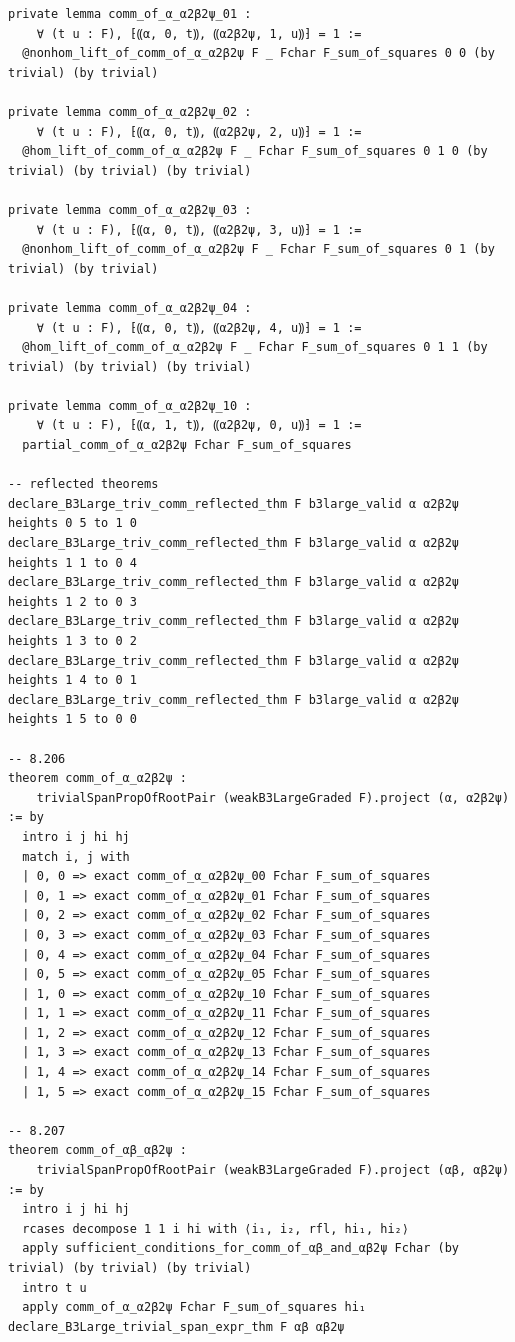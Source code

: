 \documentclass[10pt,a4paper]{article}
\begin{document}
\begin{Verbatim}
private lemma comm_of_α_α2β2ψ_01 :
    ∀ (t u : F), ⁅⸨α, 0, t⸩, ⸨α2β2ψ, 1, u⸩⁆ = 1 :=
  @nonhom_lift_of_comm_of_α_α2β2ψ F _ Fchar F_sum_of_squares 0 0 (by trivial) (by trivial)

private lemma comm_of_α_α2β2ψ_02 :
    ∀ (t u : F), ⁅⸨α, 0, t⸩, ⸨α2β2ψ, 2, u⸩⁆ = 1 :=
  @hom_lift_of_comm_of_α_α2β2ψ F _ Fchar F_sum_of_squares 0 1 0 (by trivial) (by trivial) (by trivial)

private lemma comm_of_α_α2β2ψ_03 :
    ∀ (t u : F), ⁅⸨α, 0, t⸩, ⸨α2β2ψ, 3, u⸩⁆ = 1 :=
  @nonhom_lift_of_comm_of_α_α2β2ψ F _ Fchar F_sum_of_squares 0 1 (by trivial) (by trivial)

private lemma comm_of_α_α2β2ψ_04 :
    ∀ (t u : F), ⁅⸨α, 0, t⸩, ⸨α2β2ψ, 4, u⸩⁆ = 1 :=
  @hom_lift_of_comm_of_α_α2β2ψ F _ Fchar F_sum_of_squares 0 1 1 (by trivial) (by trivial) (by trivial)

private lemma comm_of_α_α2β2ψ_10 :
    ∀ (t u : F), ⁅⸨α, 1, t⸩, ⸨α2β2ψ, 0, u⸩⁆ = 1 :=
  partial_comm_of_α_α2β2ψ Fchar F_sum_of_squares

-- reflected theorems
declare_B3Large_triv_comm_reflected_thm F b3large_valid α α2β2ψ heights 0 5 to 1 0
declare_B3Large_triv_comm_reflected_thm F b3large_valid α α2β2ψ heights 1 1 to 0 4
declare_B3Large_triv_comm_reflected_thm F b3large_valid α α2β2ψ heights 1 2 to 0 3
declare_B3Large_triv_comm_reflected_thm F b3large_valid α α2β2ψ heights 1 3 to 0 2
declare_B3Large_triv_comm_reflected_thm F b3large_valid α α2β2ψ heights 1 4 to 0 1
declare_B3Large_triv_comm_reflected_thm F b3large_valid α α2β2ψ heights 1 5 to 0 0

-- 8.206
theorem comm_of_α_α2β2ψ :
    trivialSpanPropOfRootPair (weakB3LargeGraded F).project (α, α2β2ψ) := by
  intro i j hi hj
  match i, j with
  | 0, 0 => exact comm_of_α_α2β2ψ_00 Fchar F_sum_of_squares
  | 0, 1 => exact comm_of_α_α2β2ψ_01 Fchar F_sum_of_squares
  | 0, 2 => exact comm_of_α_α2β2ψ_02 Fchar F_sum_of_squares
  | 0, 3 => exact comm_of_α_α2β2ψ_03 Fchar F_sum_of_squares
  | 0, 4 => exact comm_of_α_α2β2ψ_04 Fchar F_sum_of_squares
  | 0, 5 => exact comm_of_α_α2β2ψ_05 Fchar F_sum_of_squares
  | 1, 0 => exact comm_of_α_α2β2ψ_10 Fchar F_sum_of_squares
  | 1, 1 => exact comm_of_α_α2β2ψ_11 Fchar F_sum_of_squares
  | 1, 2 => exact comm_of_α_α2β2ψ_12 Fchar F_sum_of_squares
  | 1, 3 => exact comm_of_α_α2β2ψ_13 Fchar F_sum_of_squares
  | 1, 4 => exact comm_of_α_α2β2ψ_14 Fchar F_sum_of_squares
  | 1, 5 => exact comm_of_α_α2β2ψ_15 Fchar F_sum_of_squares

-- 8.207
theorem comm_of_αβ_αβ2ψ :
    trivialSpanPropOfRootPair (weakB3LargeGraded F).project (αβ, αβ2ψ) := by
  intro i j hi hj
  rcases decompose 1 1 i hi with ⟨i₁, i₂, rfl, hi₁, hi₂⟩
  apply sufficient_conditions_for_comm_of_αβ_and_αβ2ψ Fchar (by trivial) (by trivial) (by trivial)
  intro t u
  apply comm_of_α_α2β2ψ Fchar F_sum_of_squares hi₁
declare_B3Large_trivial_span_expr_thm F αβ αβ2ψ


\end{Verbatim}
\end{document}
